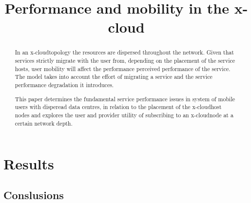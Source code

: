 \documentclass[conference]{IEEEtran}
\newcommand{\xcloud}{x-cloud}
\begin{document}
\title{Performance and mobility in the \xcloud}

\author{
\and
{}
}

\maketitle

\begin{abstract}
In an \xcloud topology the resources are dispersed throughout the network. Given that services strictly migrate with the user from, depending on the placement of the service hosts, user mobility will affect the performance perceived performance of the service. The model takes into account the effort of migrating a service and the service performance degradation it introduces.

This paper determines the fundamental service performance issues in system of mobile users with disperead data centres, in relation to the placement of the \xcloud host nodes and explores the user and provider utility of subscribing to an \xcloud node at a certain network depth.
\end{abstract}

\IEEEpeerreviewmaketitle










\section{Results}


\subsection{Conslusions} 







\end{document}
